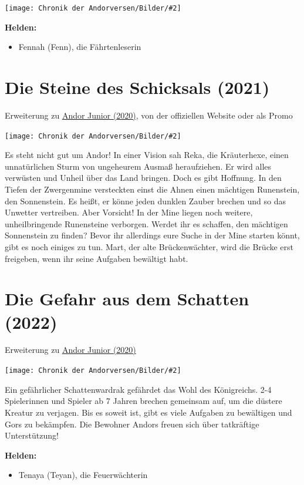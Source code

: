 \documentclass[10pt, a4paper, oneside]{book}
\newcommand{\fillbreak}{\vspace*{\fill}\columnbreak}
\newcommand{\produkt}[1]{%
    \section{#1}%
    \label{Produkt: #1}%
}
\newcommand{\refprodukt}[1]{\hyperref[Produkt: #1]{#1}}
\newcommand{\bildmitts}[2][height=0.32\textwidth,width=0.48\textwidth,keepaspectratio]{%
    \begin{center}
        \texttt{[image: Chronik der Andorversen/Bilder/\#2]}
    \end{center}
}
\begin{document}
\begin{multicols}{2}
\bildmitts{Andor Junior Fennah.jpeg}

\textbf{Helden:} 
\begin{itemize}[topsep=0pt,itemsep=-1ex,partopsep=1ex,parsep=1ex]
    \item Fennah (Fenn), die Fährtenleserin 
\end{itemize}



\produkt{Die Steine des Schicksals (2021)}

\begin{center}
    Erweiterung zu \refprodukt{Andor Junior (2020)}, von der offiziellen Website oder als Promo
\end{center}

\bildmitts{Die Steine des Schicksals Promo (2024).jpg}

Es steht nicht gut um Andor! In einer Vision sah Reka, die Kräuterhexe, einen unnatürlichen Sturm von ungeheurem Ausmaß heraufziehen. Er wird alles verwüsten und Unheil über das Land bringen. Doch es gibt Hoffnung. In den Tiefen der Zwergenmine versteckten einst die Ahnen einen mächtigen Runenstein, den Sonnenstein. Es heißt, er könne jeden dunklen Zauber brechen und so das Unwetter vertreiben. Aber Vorsicht! In der Mine liegen noch weitere, unheilbringende Runensteine verborgen. Werdet ihr es schaffen, den mächtigen Sonnenstein zu finden? Bevor ihr allerdings eure Suche in der Mine starten könnt, gibt es noch einiges zu tun. Mart, der alte Brückenwächter, wird die Brücke erst freigeben, wenn ihr seine Aufgaben bewältigt habt.


  
\fillbreak
\produkt{Die Gefahr aus dem Schatten (2022)}

\begin{center}
    Erweiterung zu \refprodukt{Andor Junior (2020)}
\end{center}

\bildmitts{Die Gefahr aus dem Schatten (2022).png}

Ein gefährlicher Schattenwardrak gefährdet das Wohl des Königreichs. 2-4 Spielerinnen und Spieler ab 7 Jahren brechen gemeinsam auf, um die düstere Kreatur zu verjagen. Bis es soweit ist, gibt es viele Aufgaben zu bewältigen und Gors zu bekämpfen. Die Bewohner Andors freuen sich über tatkräftige Unterstützung!\bigskip

\textbf{Helden:}
\begin{itemize}[topsep=0pt,itemsep=-1ex,partopsep=1ex,parsep=1ex]
    \item Tenaya (Teyan), die Feuerwächterin\bigskip
\end{itemize}


\end{multicols}
\end{document}
